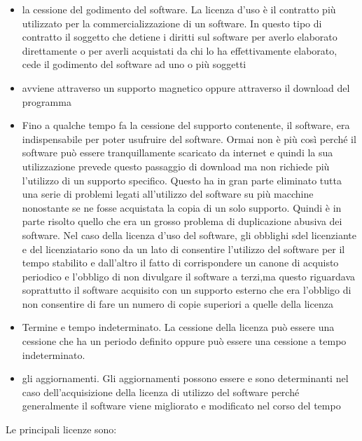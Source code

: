 \begin{itemize}
 \begin{itemize}
    \item la cessione del godimento del software. La licenza d'uso è il contratto più utilizzato per la commercializzazione di un software. In questo tipo di contratto il soggetto che detiene i diritti sul software per averlo elaborato direttamente o per averli acquistati da chi lo ha effettivamente elaborato, cede il godimento del software ad uno o più soggetti
    \item avviene attraverso un supporto magnetico oppure attraverso il download del programma
    \item Fino a qualche tempo fa la cessione del supporto contenente, il software, era indispensabile per poter usufruire del software. Ormai non è più così perché il software può essere tranquillamente scaricato da internet e quindi la sua utilizzazione prevede questo passaggio di download ma non richiede più l'utilizzo di un supporto specifico. Questo ha in gran parte eliminato tutta una serie di problemi legati all'utilizzo del software su più macchine nonostante se ne fosse acquistata la copia di un solo supporto. Quindi è in parte risolto quello che era un grosso problema di duplicazione abusiva dei software. Nel caso della licenza d'uso del software, gli obblighi sdel licenziante e del licenziatario sono da un lato di consentire l'utilizzo del software per il tempo stabilito e dall'altro il fatto di corrispondere un canone di acquisto periodico e l'obbligo di non divulgare il software a terzi,ma questo riguardava soprattutto il software acquisito con un supporto esterno che era l'obbligo di non consentire di fare un numero di copie superiori a quelle della licenza
    \item Termine e tempo indeterminato. La cessione della licenza può essere una cessione che ha un periodo definito oppure può essere una cessione a tempo indeterminato.
    \item gli aggiornamenti. Gli aggiornamenti possono essere e sono determinanti nel caso dell'acquisizione della licenza di utilizzo del software perché generalmente il software viene migliorato e modificato nel corso del tempo
 \end{itemize}
 
 

Le principali licenze sono:


\end{itemize}
